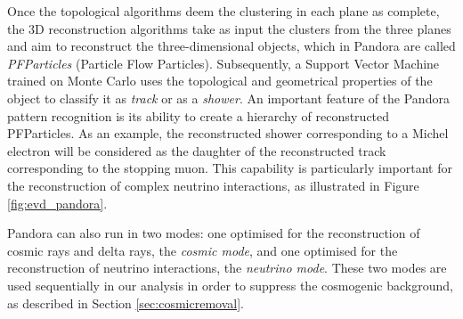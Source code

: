 Once the topological algorithms deem the clustering in each plane as complete, the 3D reconstruction algorithms take as input the clusters from the three planes and aim to reconstruct the three-dimensional objects, which in Pandora are called \emph{PFParticles} (Particle Flow Particles).
Subsequently, a Support Vector Machine trained on Monte Carlo uses the topological and geometrical properties of the object to classify it as \emph{track} or as a \emph{shower}. 
An important feature of the Pandora pattern recognition is its ability to create a hierarchy of reconstructed PFParticles. As an example, the reconstructed shower corresponding to a Michel electron will be considered as the daughter of the reconstructed track corresponding to the stopping muon. This capability is particularly important for the reconstruction of complex neutrino interactions, as illustrated in Figure \ref{fig:evd_pandora}.

Pandora can also run in two modes: one optimised for the reconstruction of cosmic rays and delta rays, the \emph{cosmic mode}, and one optimised for the reconstruction of neutrino interactions, the \emph{neutrino mode}. These two modes are used sequentially in our analysis in order to suppress the cosmogenic background, as described in Section \ref{sec:cosmicremoval}.